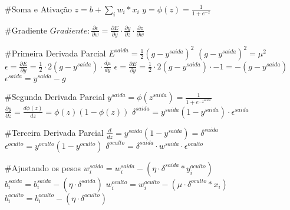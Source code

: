 #Soma e Ativação
\(z = b + \sum_i w_i * x_i \)
\(y = \phi (z) = \frac{1}{1+e^{-z}}\)

#Gradiente
\(Gradiente: \frac{\partial\epsilon}{\partial w} = \frac{\partial E}{\partial y} \cdot \frac{\partial y}{\partial z} \cdot \frac{\partial z}{\partial w} \)

#Primeira Derivada Parcial
\(E^{saida} = \frac{1}{2} (g - y^{saida})^2 \)
\((g - y^{saida})^2 = \mu^2 \)
\(\epsilon = \frac{\partial E}{\partial y} = \frac{1}{2} \cdot 2(g-y^{saida}) \cdot \frac{d\mu}{dy} \) 
\(\epsilon = \frac{\partial E}{\partial y} = \frac{1}{2} \cdot 2(g-y^{saida}) \cdot -1 = -(g-y^{saida}) \)
\(\epsilon^{saida} = y^{saida}-g \)

#Segunda Derivada Parcial
\( y^{saida} = \phi(z^{saida}) = \frac{1}{1+e^{-z^{saida}}} \)
\(\frac{\partial y}{\partial z} = \frac{d\phi(z)}{dz} = \phi(z)(1-\phi(z)) \)
\(\delta^{saida} = y^{saida}(1-y^{saida}) \cdot \epsilon^{saida}\)

#Terceira Derivada Parcial 
\( \frac{d}{dz} = y^{saida} (1-y^{saida}) = \delta^{saida} \) 
\(\epsilon^{oculto} = y^{oculto}(1-y^{oculto})\)
\(\delta^{oculto} = \delta^{saida} \cdot w^{saida} \cdot \epsilon^{oculto}\)

#Ajustando os pesos
\(w_i^{saida} = w_i^{saida} - (\eta \cdot \delta^{saida} * y_i^{oculto}) \)
\(b_i^{saida} = b_i^{saida} - (\eta \cdot \delta^{saida})\)
\(w_i^{oculto} = w_i^{oculto} - (\mu \cdot \delta^{oculto} * x_i) \)
\(b_i^{oculto} = b_i^{oculto} - (\eta \cdot \delta^{oculto})\)